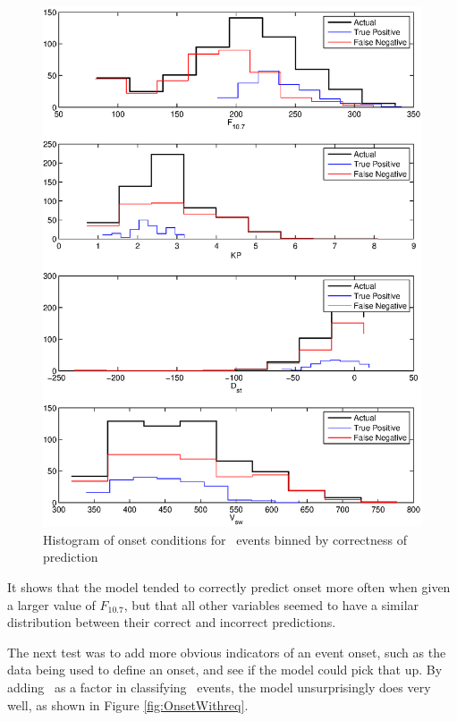 \begin{figure}[htp!]
	\centering
	\includegraphics[width=0.8\linewidth]{Figures/CH5/NNBinaryOnset-daily-hist.eps}
	\caption{Histogram of onset conditions for \req\ events binned by correctness of prediction}
	\label{fig:OnsetEventsHist}
\end{figure}

It shows that the model tended to correctly predict onset more often when given a larger value of $F_{10.7}$, but that all other variables seemed to have a similar distribution between their correct and incorrect predictions. 

The next test was to add more obvious indicators of an event onset, such as the data being used to define an onset, and see if the model could pick that up. By adding \req\ as a factor in classifying \req\ events, the model unsurprisingly does very well, as shown in Figure \ref{fig:OnsetWithreq}.

